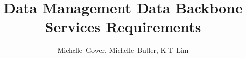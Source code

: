 \title{Data Management Data Backbone Services Requirements}
\author{
Michelle~Gower,
Michelle~Butler,
K-T~Lim
}

